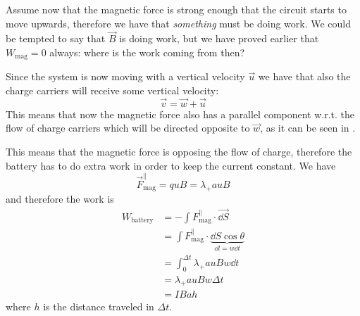 \documentclass[12pt]{extarticle}
\begin{document}
Assume now that the magnetic force is strong enough that the circuit starts to move upwards,
therefore we have that \emph{something} must be doing work.
We could be tempted to say that $\vec B$ is doing work, but we have proved earlier that $W_\text{mag} = 0$ always:
where is the work coming from then?

Since the system is now moving with a vertical velocity $\vec u$ we have that also the charge carriers
will receive some vertical velocity:
\begin{equation}
	\vec v = \vec w + \vec u
\end{equation}
This means that now the magnetic force also has a parallel component w.r.t. the flow of charge carriers
which will be directed opposite to $\vec w$, as it can be seen in .

This means that the magnetic force is opposing the flow of charge, therefore the battery has to do extra work
in order to keep the current constant.
We have
\begin{equation}
	\vec F_\text{mag}^\parallel = q u B = \lambda_+ a u B
\end{equation}
and therefore the work is
\begin{align}
	W_\text{battery} & = - \int F_\text{mag}^\parallel \cdot \vec{\dd S}                                    \\
	                 & = \int F_\text{mag}^\parallel \cdot \underbrace{\dd S \cos \theta}_{\dd l = w \dd t} \\
	                 & = \int_0^{\Delta t} \lambda_+ a u B w \dd t                                          \\
	                 & = \lambda_+ a u B w \Delta t                                                         \\
	                 & = I B a h
\end{align}
where $h$ is the distance traveled in $\Delta t$.
\end{document}
